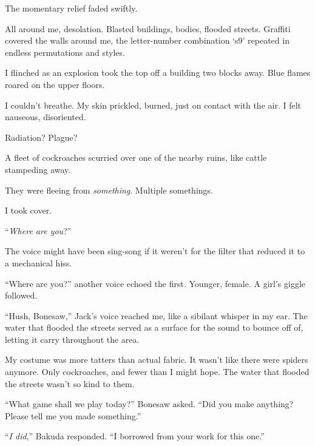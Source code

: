 The momentary relief faded swiftly.



All around me, desolation.  Blasted buildings, bodies, flooded streets.  Graffiti covered the walls around me, the letter-number combination `s9' repeated in endless permutations and styles.



I flinched as an explosion took the top off a building two blocks away.  Blue flames roared on the upper floors.



I couldn't breathe.  My skin prickled, burned, just on contact with the air.  I felt nauseous, disoriented.



Radiation?  Plague?



A fleet of cockroaches scurried over one of the nearby ruins, like cattle stampeding away.



They were fleeing from \emph{something}.  Multiple somethings.



I took cover.



``\emph{Where are you}?''



The voice might have been sing-song if it weren't for the filter that reduced it to a mechanical hiss.



``Where are you?'' another voice echoed the first.  Younger, female.  A girl's giggle followed.



``Hush, Bonesaw,'' Jack's voice reached me, like a sibilant whisper in my ear.  The water that flooded the streets served as a surface for the sound to bounce off of, letting it carry throughout the area.



My costume was more tatters than actual fabric.  It wasn't like there were spiders anymore.  Only cockroaches, and fewer than I might hope.  The water that flooded the streets wasn't so kind to them.



``What game shall we play today?'' Bonesaw asked.  ``Did you make anything?  Please tell me you made something.''



``\emph{I did},'' Bakuda responded.  ``I borrowed from your work for this one.''



